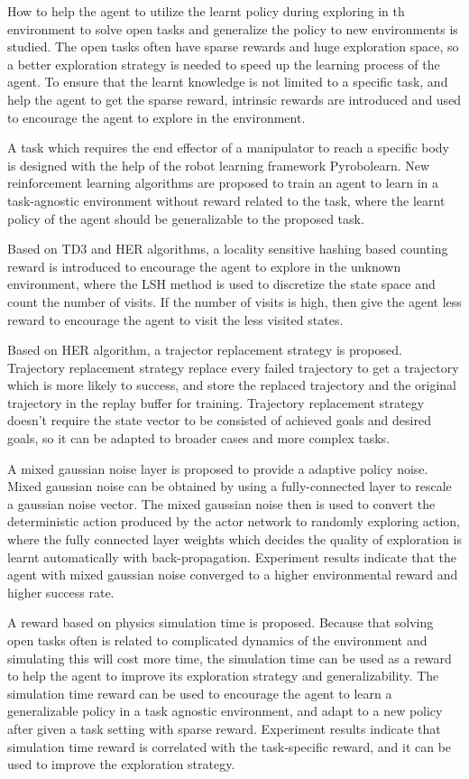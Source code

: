 \begin{eabstract}
How to help the agent to utilize the learnt policy during exploring in th environment to solve open tasks and generalize the policy to new environments is studied.
The open tasks often have sparse rewards and huge exploration space, so a better exploration strategy is needed to speed up the learning process of the agent.
To ensure that the learnt knowledge is not limited to a specific task, and help the agent to get the sparse reward, intrinsic rewards are introduced and used to encourage the agent to explore in the environment.

A task which requires the end effector of a manipulator to reach a specific body is designed with the help of the robot learning framework Pyrobolearn. New reinforcement learning algorithms are proposed to train an agent to learn in a task-agnostic environment without reward related to the task, where the learnt policy of the agent should be generalizable to the proposed task.

Based on TD3 and HER algorithms, a locality sensitive hashing based counting reward is introduced to encourage the agent to explore in the unknown environment, where the LSH method is used to discretize the state space and count the number of visits. If the number of visits is high, then give the agent less reward to encourage the agent to visit the less visited states. 

    Based on HER algorithm, a trajector replacement strategy is proposed.
    Trajectory replacement strategy replace every failed trajectory to get a trajectory which is more likely to success, and store the replaced trajectory and the original trajectory in the replay buffer for training.
    Trajectory replacement strategy doesn't require the state vector to be consisted of achieved goals and desired goals, so it can be adapted to broader cases and more complex tasks.

    A mixed gaussian noise layer is proposed to provide a adaptive policy noise. 
    Mixed gaussian noise can be obtained by using a fully-connected layer to rescale a gaussian noise vector.
    The mixed gaussian noise then is used to convert the deterministic action produced by the actor network to randomly exploring action, where the fully connected layer weights which decides the quality of exploration is learnt automatically with back-propagation.
    Experiment results indicate that the agent with mixed gaussian noise converged to a higher environmental reward and higher success rate.

    A reward based on physics simulation time is proposed. 
    Because that solving open tasks often is related to complicated dynamics of the environment and simulating this will cost more time, the simulation time can be used as a reward to help the agent to improve its exploration strategy and generalizability.
    The simulation time reward can be used to encourage the agent to learn a generalizable policy in a task agnostic environment, and adapt to a new policy after given a task setting with sparse reward.
    Experiment results indicate that simulation time reward is correlated with the task-specific reward, and it can be used to improve the exploration strategy.
\end{eabstract}
